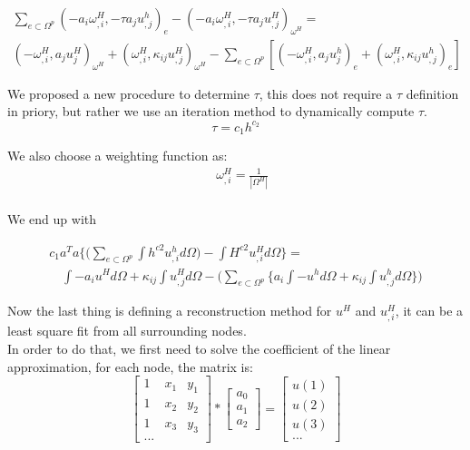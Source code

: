 \documentclass[10pt]{article}
\begin{document}
\begin{multline}
\sum_{e \subset \Omega^{p}}(-a_{i} \omega^{H}_{,i},  -\tau a_{j} u^{h}_{,j})_{e} - (-a_{i} \omega^{H}_{,i},  -\tau a_{j} u^{H}_{,j})_{\omega^{H}}  =\\
 (-\omega^{H}_{,i},  a_{j} u^{H}_{j})_{\omega^{H}}  + (\omega^{H}_{,i},  \kappa_{ij} u^{H}_{,j})_{\omega^{H}} -\sum_{e \subset \Omega^{p}}[(- \omega^{H}_{,i},  a_{j} u^{h}_{j})_{e}+(\omega^{H}_{,i},\kappa_{ij} u^{h}_{,j})_{e}]\label{eq:17} 
\end{multline}

We proposed a new procedure to determine $\tau$, this does not require a $\tau$ definition in priory, but rather we use an iteration method to dynamically compute $\tau$. \\

\begin{equation}
\tau = c_{1}h^{c_{2}}\label{eq:18} 
\end{equation}

We also choose a weighting function as:
\begin{equation}
    \begin{aligned}
       \quad \omega^{H}_{,i}  = \frac{1}{|\Omega^H|} \\
    \end{aligned}\label{eq:19}
\end{equation}

We end up with

\begin{multline}
c_{1}a^{T}a\bigg\{ \bigg (\sum_{e \subset \Omega^{p}} \int {h^{c2} u^{h}_{,i} } d\Omega\bigg )-\int {H^{c2} u^{H}_{,i}} d\Omega \bigg\}= \\ 
\quad  \int {- a_{i}u^{H}}d\Omega + \kappa_{ij} \int{u^{H}_{,j}}d\Omega - \bigg(\sum_{e \subset \Omega^{p}} \bigg\{a_{i}\int{- u^{h}}d\Omega + \kappa_{ij} \int{  u^{h}_{,j}}d\Omega \bigg\}\bigg)\label{eq:21} 
\end{multline}


Now the last thing is defining a reconstruction method for $u^{H}$ and $u^{H}_{,i}$, it can be a least square fit from all surrounding nodes. \\
\noindent In order to do that, we first need to solve the coefficient of the linear approximation, for each node, the matrix is:
\begin{equation}
\begin{bmatrix}

   1 & x_{1}  & y_{1}\\ 1 &  x_{2}  & y_{2} \\ 1 &  x_{3}  & y_{3}\\...
\end{bmatrix}
 *
 \begin{bmatrix}
 a_{0}  \\ a_{1} \\ a_{2}
 \end{bmatrix}
 =
  \begin{bmatrix}
 u(1)  \\  u(2) \\ u(3)  \\...
 \end{bmatrix}
\label{eq:22}
\end{equation}
\end{document}
